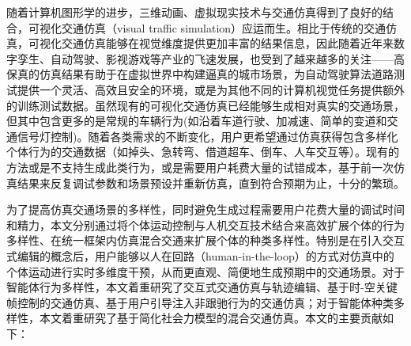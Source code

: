 \cleardoublepage
{}



随着计算机图形学的进步，三维动画、虚拟现实技术与交通仿真得到了良好的结合，可视化交通仿真（visual traffic simulation）应运而生。相比于传统的交通仿真，可视化交通仿真能够在视觉维度提供更加丰富的结果信息，因此随着近年来数字孪生、自动驾驶、影视游戏等产业的飞速发展，也受到了越来越多的关注——高保真的仿真结果有助于在虚拟世界中构建逼真的城市场景，为自动驾驶算法道路测试提供一个灵活、高效且安全的环境，或是为其他不同的计算机视觉任务提供额外的训练测试数据。虽然现有的可视化交通仿真已经能够生成相对真实的交通场景，但其中包含更多的是常规的车辆行为(如沿着车道行驶、加减速、简单的变道和交通信号灯控制)。随着各类需求的不断变化，用户更希望通过仿真获得包含多样化个体行为的交通数据（如掉头、急转弯、借道超车、倒车、人车交互等）。现有的方法或是不支持生成此类行为，或是需要用户耗费大量的试错成本，基于前一次仿真结果来反复调试参数和场景预设并重新仿真，直到符合预期为止，十分的繁琐。

为了提高仿真交通场景的多样性，同时避免生成过程需要用户花费大量的调试时间和精力，本文分别通过将个体运动控制与人机交互技术结合来高效扩展个体的行为多样性、在统一框架内仿真混合交通来扩展个体的种类多样性。特别是在引入交互式编辑的概念后，用户能够以人在回路（human-in-the-loop）的方式对仿真中的个体运动进行实时多维度干预，从而更直观、简便地生成预期中的交通场景。对于智能体行为多样性，本文着重研究了交互式交通仿真与轨迹编辑、基于时-空关键帧控制的交通仿真、基于用户引导注入非跟驰行为的交通仿真；对于智能体种类多样性，本文着重研究了基于简化社会力模型的混合交通仿真。本文的主要贡献如下：


